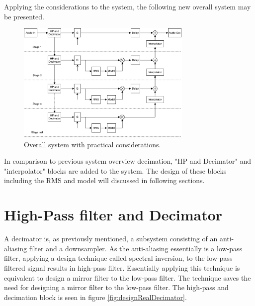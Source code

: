 



Applying the considerations to the system, the following new overall system may be presented.

\begin{figure}[H]
\centering
\includegraphics[width=0.75\textwidth]{figures/designRealBlock1.pdf}
\caption{Overall system with practical considerations.}
\label{fig:designRealBlock}
\end{figure}


In comparison to previous system overview decimation, "HP and Decimator" and "interpolator" blocks are added to the system. The design of these blocks including the RMS and model will discussed in following sections.


\section{High-Pass filter and Decimator}

A decimator is, as previously mentioned, a subsystem consisting of an anti-aliasing filter and a downsampler. As the anti-aliasing essentially is a low-pass filter, applying a design technique called spectral inversion, to the low-pass filtered signal results in high-pass filter. Essentially applying this technique is equivalent to design a mirror filter to the low-pass filter. The technique saves the need for designing a mirror filter to the low-pass filter. The high-pass and decimation block is seen in figure \autoref{fig:designRealDecimator}.

